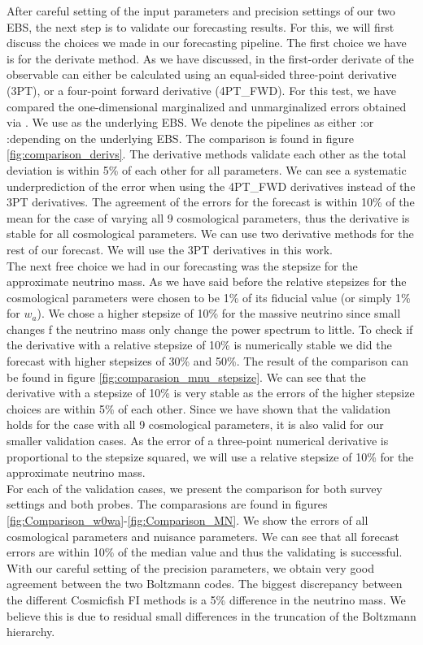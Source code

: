 \documentclass[../main.tex]{subfiles}
\begin{document}
After careful setting of the input parameters and precision settings of our two EBS, the next step is to validate our forecasting results. For this, we will first discuss the choices we made in our forecasting pipeline. The first choice we have is for the derivate method. As we have discussed, in \cosmicfish the first-order derivate of the observable can either be calculated using an equal-sided three-point derivative (3PT), or a four-point forward derivative (4PT\_FWD). For this test, we have compared the one-dimensional marginalized and unmarginalized errors obtained via \cosmicfish. We use \camb as the underlying EBS. We denote the \cosmicfish pipelines as either \cosmicfish:\camb or \cosmicfish:\class depending on the underlying EBS. The comparison is found in figure \ref{fig:comparison_derivs}. The derivative methods validate each other as the total deviation is within 5\% of each other for all parameters. We can see a systematic underprediction of the error when using the 4PT\_FWD derivatives instead of the 3PT derivatives. The agreement of the errors for the forecast is within 10\% of the mean for the case of varying all 9 cosmological parameters, thus the derivative is stable for all cosmological parameters. We can use two derivative methods for the rest of our forecast. We will use the 3PT derivatives in this work.\\
The next free choice we had in our forecasting was the stepsize for the approximate neutrino mass. As we have said before the relative stepsizes for the cosmological parameters were chosen to be 1\% of its fiducial value (or simply 1\% for $w_a$). We chose a higher stepsize of 10\% for the massive neutrino since small changes f the neutrino mass only change the power spectrum to little. To check if the derivative with a relative stepsize of 10\% is numerically stable we did the forecast with higher stepsizes of 30\% and 50\%. The result of the comparison can be found in figure \ref{fig:comparasion_mnu_stepsize}. We can see that the derivative with a stepsize of 10\% is very stable as the errors of the higher stepsize choices are within 5\% of each other. Since we have shown that the validation holds for the case with all 9 cosmological parameters, it is also valid for our smaller validation cases. As the error of a three-point numerical derivative is proportional to the stepsize squared, we will use a relative stepsize of 10\% for the approximate neutrino mass.\\
For each of the validation cases, we present the comparison for both survey settings and both probes. The comparasions are found in figures \ref{fig:Comparison_w0wa}-\ref{fig:Comparison_MN}. We show the errors of all cosmological parameters and nuisance parameters. We can see that all forecast errors are within 10\% of the median value and thus the validating is successful. With our careful setting of the precision parameters, we obtain very good agreement between the two Boltzmann codes. The biggest discrepancy between the different Cosmicfish FI methods is a 5\% difference in the neutrino mass. We believe this is due to residual small differences in the truncation of the Boltzmann hierarchy.\\
\end{document}
